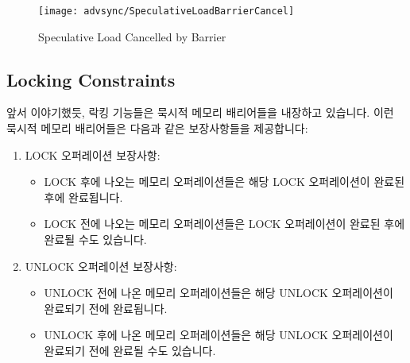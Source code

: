 \begin{enumerate}
\begin{figure}[htb]
\begin{center}
\texttt{[image: advsync/SpeculativeLoadBarrierCancel]}
\end{center}
\caption{Speculative Load Cancelled by Barrier}
\end{figure}

\subsection{Locking Constraints}
\label{sec:advsync:Locking Constraints}

앞서 이야기했듯, 락킹 기능들은 묵시적 메모리 배리어들을 내장하고 있습니다.
이런 묵시적 메모리 배리어들은 다음과 같은 보장사항들을 제공합니다:
\begin{enumerate}
\item	LOCK 오퍼레이션 보장사항:
	\begin{itemize}
	\item	LOCK 후에 나오는 메모리 오퍼레이션들은 해당 LOCK 오퍼레이션이
		완료된 후에 완료됩니다.
	\item	LOCK 전에 나오는 메모리 오퍼레이션들은 LOCK 오퍼레이션이 완료된
		후에 완료될 수도 있습니다.
	\end{itemize}
\item	UNLOCK 오퍼레이션 보장사항:
	\begin{itemize}
	\item	UNLOCK 전에 나온 메모리 오퍼레이션들은 해당 UNLOCK 오퍼레이션이
		완료되기 전에 완료됩니다.
	\item	UNLOCK 후에 나온 메모리 오퍼레이션들은 해당 UNLOCK 오퍼레이션이
		완료되기 전에 완료될 수도 있습니다.
	\end{itemize}
\iffalse


\end{enumerate}
\end{enumerate}
